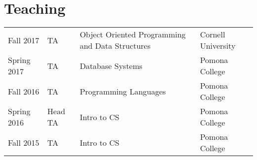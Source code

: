 \documentclass[]{deedy-resume-openfont}
\begin{document}
\begin{minipage}[t]{0.66\textwidth}

\section{Teaching} 

\begin{tabular}{llll}
  
    Fall 2017 & TA & Object Oriented Programming and Data Structures & Cornell University \\
  
    Spring 2017 & TA & Database Systems & Pomona College \\
  
    Fall 2016 & TA & Programming Languages & Pomona College \\
  
    Spring 2016 & Head TA & Intro to CS & Pomona College \\
  
    Fall 2015 & TA & Intro to CS & Pomona College \\
  
\end{tabular}


\sectionsep

\end{minipage} 
\end{document}
